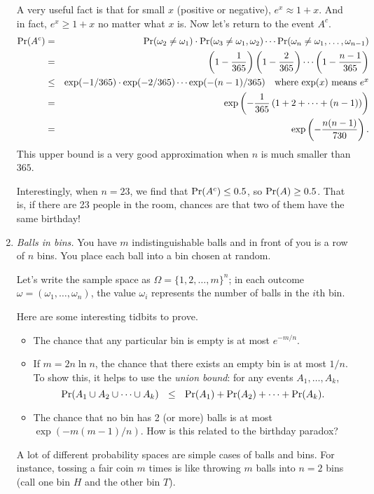 \begin{enumerate}
A very useful fact is that for small $x$ (positive or negative), $e^x \approx 1+x$. And in fact, $e^x \geq 1+x$ no matter what $x$ is. Now let's return to the event $A^c$.
\begin{eqnarray*}
\mbox{\rm Pr}(A^c) & = & \mbox{\rm Pr}(\omega_2 \neq \omega_1) \cdot \mbox{\rm Pr}(\omega_3 \neq \omega_1, \omega_2) \cdots \mbox{\rm Pr}(\omega_n \neq \omega_1, \ldots, \omega_{n-1}) \\
& = & \left(1 - \frac{1}{365} \right) \left(1 - \frac{2}{365} \right) \cdots \left(1 - \frac{n-1}{365} \right) \\
& \leq & \exp(-1/365) \cdot \exp(-2/365) \cdots \exp(-(n-1)/365) \mbox{\ \ \ where $\exp(x)$ means $e^x$} \\
& = & \exp \left( - \frac{1}{365} \left(1 + 2 + \cdots + (n-1) \right) \right) \\
& = & \exp \left( - \frac{n(n-1)}{730} \right). 
\end{eqnarray*}
This upper bound is a very good approximation when $n$ is much smaller than $365$. 

Interestingly, when $n = 23$, we find that $\mbox{\rm Pr}(A^c) \leq 0.5$, so $\mbox{\rm Pr}(A) \geq 0.5$. That is, if there are 23 people in the room, chances are that two of them have the same birthday!

\item {\it Balls in bins.} You have $m$ indistinguishable balls and in front of you is a row of $n$ bins. You place each ball into a bin chosen at random.

Let's write the sample space as $\Omega = \{1,2,\ldots, m\}^n$; in each outcome $\omega = (\omega_1, \ldots, \omega_n)$, the value $\omega_i$ represents the number of balls in the $i$th bin.

Here are some interesting tidbits to prove.
\begin{itemize}
\item The chance that any particular bin is empty is at most $e^{-m/n}$.
\item If $m = 2n \ln n$, the chance that there exists an empty bin is at most $1/n$. To show this, it helps to use the {\it union bound}: for any events $A_1, \ldots, A_k$,
$$ \pr(A_1 \cup A_2 \cup \cdots \cup A_k) \ \ \leq \ \ \pr(A_1) + \pr(A_2) + \cdots + \pr(A_k).$$
\item The chance that no bin has 2 (or more) balls is at most $\exp(-m(m-1)/n)$. How is this related to the birthday paradox?
\end{itemize}
A lot of different probability spaces are simple cases of balls and bins. For instance, tossing a fair coin $m$ times is like throwing $m$ balls into $n=2$ bins (call one bin $H$ and the other bin $T$).


\end{enumerate}
